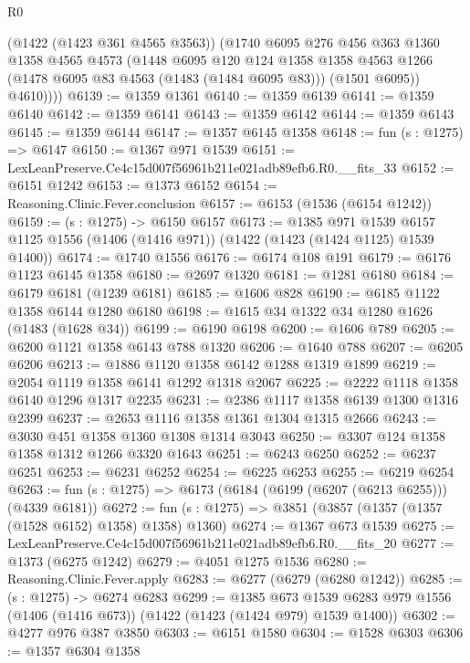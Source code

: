 \begin{lexlean}{R0}
\begin{coremodule}
          (@1422 (@1423 @361 @4565 @3563))
          (@1740
            @6095
            @276
            @456
            @363
            @1360
            @1358
            @4565
            @4573
            (@1448
              @6095
              @120
              @124
              @1358
              @1358
              @4563
              @1266
              (@1478 @6095 @83 @4563 (@1483 (@1484 @6095 @83)))
              (@1501 @6095))
            @4610))))
@6139 := @1359 @1361
@6140 := @1359 @6139
@6141 := @1359 @6140
@6142 := @1359 @6141
@6143 := @1359 @6142
@6144 := @1359 @6143
@6145 := @1359 @6144
@6147 := @1357 @6145 @1358
@6148 := fun (s : @1275) => @6147
@6150 := @1367 @971 @1539
@6151 := LexLeanPreserve.Ce4c15d007f56961b211e021adb89efb6.R0.__fits_33
@6152 := @6151 @1242
@6153 := @1373 @6152
@6154 := Reasoning.Clinic.Fever.conclusion
@6157 := @6153 (@1536 (@6154 @1242))
@6159 := (s : @1275) -> @6150 @6157
@6173 := @1385
    @971
    @1539
    @6157
    @1125
    @1556
    (@1406 (@1416 @971))
    (@1422 (@1423 (@1424 @1125) @1539 @1400))
@6174 := @1740 @1556
@6176 := @6174 @108 @191
@6179 := @6176 @1123 @6145 @1358
@6180 := @2697 @1320
@6181 := @1281 @6180
@6184 := @6179 @6181 (@1239 @6181)
@6185 := @1606 @828
@6190 := @6185 @1122 @1358 @6144 @1280 @6180
@6198 := @1615 @34 @1322 @34 @1280 @1626 (@1483 (@1628 @34))
@6199 := @6190 @6198
@6200 := @1606 @789
@6205 := @6200 @1121 @1358 @6143 @788 @1320
@6206 := @1640 @788
@6207 := @6205 @6206
@6213 := @1886 @1120 @1358 @6142 @1288 @1319 @1899
@6219 := @2054 @1119 @1358 @6141 @1292 @1318 @2067
@6225 := @2222 @1118 @1358 @6140 @1296 @1317 @2235
@6231 := @2386 @1117 @1358 @6139 @1300 @1316 @2399
@6237 := @2653 @1116 @1358 @1361 @1304 @1315 @2666
@6243 := @3030 @451 @1358 @1360 @1308 @1314 @3043
@6250 := @3307 @124 @1358 @1358 @1312 @1266 @3320 @1643
@6251 := @6243 @6250
@6252 := @6237 @6251
@6253 := @6231 @6252
@6254 := @6225 @6253
@6255 := @6219 @6254
@6263 := fun (s : @1275) => @6173 (@6184 (@6199 (@6207 (@6213 @6255))) (@4339 @6181))
@6272 := fun (s : @1275) => @3851 (@3857 (@1357 (@1357 (@1528 @6152) @1358) @1358) @1360)
@6274 := @1367 @673 @1539
@6275 := LexLeanPreserve.Ce4c15d007f56961b211e021adb89efb6.R0.__fits_20
@6277 := @1373 (@6275 @1242)
@6279 := @4051 @1275 @1536
@6280 := Reasoning.Clinic.Fever.apply
@6283 := @6277 (@6279 (@6280 @1242))
@6285 := (s : @1275) -> @6274 @6283
@6299 := @1385
    @673
    @1539
    @6283
    @979
    @1556
    (@1406 (@1416 @673))
    (@1422 (@1423 (@1424 @979) @1539 @1400))
@6302 := @4277 @976 @387 @3850
@6303 := @6151 @1580
@6304 := @1528 @6303
@6306 := @1357 @6304 @1358

\end{coremodule}
\end{lexlean}

